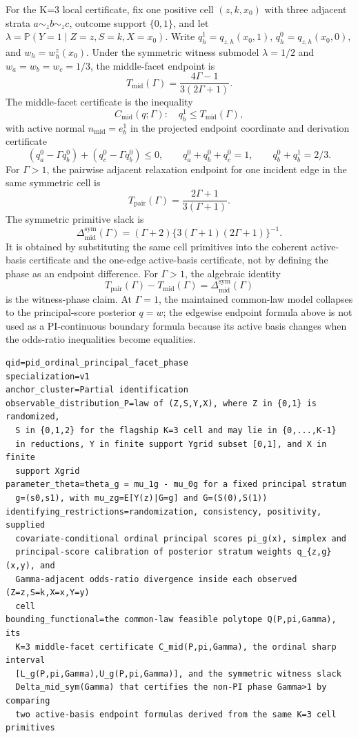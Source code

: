 \documentclass[11pt]{article}
\renewcommand{\Pr}{\mathbb{P}}
\theoremstyle{definition}
\theoremstyle{plain}
\theoremstyle{remark}
\begin{document}
For the K=3 local certificate, fix one positive cell \((z,k,x_0)\) with three adjacent strata \(a\sim_z b\sim_z c\), outcome support \(\{0,1\}\), and let \(\lambda=\Pr(Y=1\mid Z=z,S=k,X=x_0)\).  Write \(q_h^1=q_{z,h}(x_0,1)\), \(q_h^0=q_{z,h}(x_0,0)\), and \(w_h=w_h^z(x_0)\).  Under the symmetric witness submodel \(\lambda=1/2\) and \(w_a=w_b=w_c=1/3\), the middle-facet endpoint is
\[
  T_{\mathrm{mid}}(\Gamma)=\frac{4\Gamma-1}{3(2\Gamma+1)}.
\]
The middle-facet certificate is the inequality
\[
  C_{\mathrm{mid}}(q;\Gamma):\quad q_b^1\le T_{\mathrm{mid}}(\Gamma),
\]
with active normal \(n_{\mathrm{mid}}=e_b^1\) in the projected endpoint coordinate and derivation certificate
\[
  (q_a^0-\Gamma q_b^0)+(q_c^0-\Gamma q_b^0)\le0,
  \qquad q_a^0+q_b^0+q_c^0=1,
  \qquad q_b^0+q_b^1=2/3.
\]
For \(\Gamma>1\), the pairwise adjacent relaxation endpoint for one incident edge in the same symmetric cell is
\[
  T_{\mathrm{pair}}(\Gamma)=\frac{2\Gamma+1}{3(\Gamma+1)}.
\]
The symmetric primitive slack is
\[
  \Delta_{\mathrm{mid}}^{\mathrm{sym}}(\Gamma)
  =
  (\Gamma+2)\{3(\Gamma+1)(2\Gamma+1)\}^{-1}.
\]
It is obtained by substituting the same cell primitives into the coherent active-basis certificate and the one-edge active-basis certificate, not by defining the phase as an endpoint difference.  For \(\Gamma>1\), the algebraic identity
\[
  T_{\mathrm{pair}}(\Gamma)-T_{\mathrm{mid}}(\Gamma)
  =
  \Delta_{\mathrm{mid}}^{\mathrm{sym}}(\Gamma)
\]
is the witness-phase claim.  At \(\Gamma=1\), the maintained common-law model collapses to the principal-score posterior \(q=w\); the edgewise endpoint formula above is not used as a PI-continuous boundary formula because its active basis changes when the odds-ratio inequalities become equalities.

\begin{verbatim}
qid=pid_ordinal_principal_facet_phase
specialization=v1
anchor_cluster=Partial identification
observable_distribution_P=law of (Z,S,Y,X), where Z in {0,1} is randomized,
  S in {0,1,2} for the flagship K=3 cell and may lie in {0,...,K-1}
  in reductions, Y in finite support Ygrid subset [0,1], and X in finite
  support Xgrid
parameter_theta=theta_g = mu_1g - mu_0g for a fixed principal stratum
  g=(s0,s1), with mu_zg=E[Y(z)|G=g] and G=(S(0),S(1))
identifying_restrictions=randomization, consistency, positivity, supplied
  covariate-conditional ordinal principal scores pi_g(x), simplex and
  principal-score calibration of posterior stratum weights q_{z,g}(x,y), and
  Gamma-adjacent odds-ratio divergence inside each observed (Z=z,S=k,X=x,Y=y)
  cell
bounding_functional=the common-law feasible polytope Q(P,pi,Gamma), its
  K=3 middle-facet certificate C_mid(P,pi,Gamma), the ordinal sharp interval
  [L_g(P,pi,Gamma),U_g(P,pi,Gamma)], and the symmetric witness slack
  Delta_mid_sym(Gamma) that certifies the non-PI phase Gamma>1 by comparing
  two active-basis endpoint formulas derived from the same K=3 cell primitives
\end{verbatim}
\end{document}
